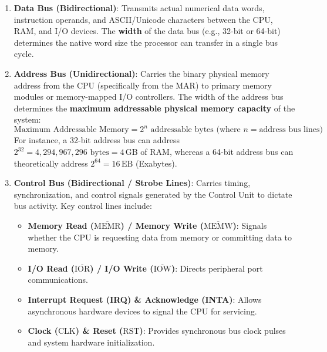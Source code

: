 \begin{enumerate}[leftmargin=1.5em]
    \item \textbf{Data Bus (Bidirectional)}: Transmits actual numerical data words, instruction operands, and ASCII/Unicode characters between the CPU, RAM, and I/O devices. The \textbf{width} of the data bus (e.g., 32-bit or 64-bit) determines the native word size the processor can transfer in a single bus cycle.
    \item \textbf{Address Bus (Unidirectional)}: Carries the binary physical memory address from the CPU (specifically from the MAR) to primary memory modules or memory-mapped I/O controllers. The width of the address bus determines the \textbf{maximum addressable physical memory capacity} of the system:
    \begin{equation}
        \text{Maximum Addressable Memory} = 2^n \text{ addressable bytes (where } n = \text{address bus lines)}
    \end{equation}
    For instance, a 32-bit address bus can address $2^{32} = 4{,}294{,}967{,}296\text{ bytes} = 4\,\text{GB}$ of RAM, whereas a 64-bit address bus can theoretically address $2^{64} = 16\,\text{EB}$ (Exabytes).
    \item \textbf{Control Bus (Bidirectional / Strobe Lines)}: Carries timing, synchronization, and control signals generated by the Control Unit to dictate bus activity. Key control lines include:
    \begin{itemize}
        \item \textbf{Memory Read ($\overline{\text{MEMR}}$) / Memory Write ($\overline{\text{MEMW}}$)}: Signals whether the CPU is requesting data from memory or committing data to memory.
        \item \textbf{I/O Read ($\overline{\text{IOR}}$) / I/O Write ($\overline{\text{IOW}}$)}: Directs peripheral port communications.
        \item \textbf{Interrupt Request (IRQ) \& Acknowledge (INTA)}: Allows asynchronous hardware devices to signal the CPU for servicing.
        \item \textbf{Clock ($\text{CLK}$) \& Reset ($\text{RST}$)}: Provides synchronous bus clock pulses and system hardware initialization.
    \end{itemize}
\end{enumerate}

